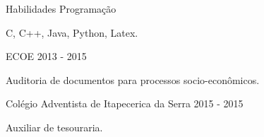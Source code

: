 \documentclass[11pt, a4paper]{awesome-cv} %
\begin{document}
 
 
\begin{cventries} 
 
 
\cventry 
{} %
{Habilidades} %
{} %
{} %
{Programação} %
{} %
{} %
{ %
\begin{cvitems} 
\item {C, C++, Java, Python, Latex.} 
\end{cvitems} 
} 
 
 
\end{cventries} 


 
\begin{cventries} 
 
 
\cventry 
{} %
{ECOE} %
{} %
{2013 - 2015} %
{ %
\begin{cvitems} 
\item {Auditoria de documentos para processos socio-econômicos.} 
\end{cvitems} 
} 
 
 
 
\cventry 
{} %
{Colégio Adventista de Itapecerica da Serra} %
{} %
{2015 - 2015} %
{ %
\begin{cvitems} 
\item {Auxiliar de tesouraria.} 
\end{cvitems} 
} 
 
 
 
\end{cventries} 
 
 
\end{document}
